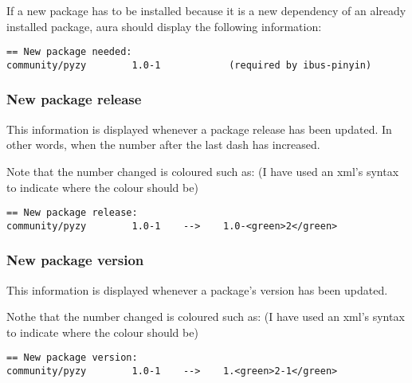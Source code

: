\documentclass{article}
\begin{document}
If a new package has to be installed because it is a new dependency of an
already installed package, aura should display the following information:

\begin{shaded}
\begin{verbatim}
== New package needed:
community/pyzy        1.0-1            (required by ibus-pinyin)
\end{verbatim}
\end{shaded}


\subsubsection{New package release}

This information is displayed whenever a package release has been updated. In
other words, when the number after the last dash has increased.

Note that the number changed is coloured such as: (I have used an xml's syntax
to indicate where the colour should be)

\begin{shaded}
\begin{verbatim}
== New package release:
community/pyzy        1.0-1    -->    1.0-<green>2</green>
\end{verbatim}
\end{shaded}


\subsubsection{New package version}

This information is displayed whenever a package's version has been updated.

Nothe that the number changed is coloured such as: (I have used an xml's syntax
to indicate where the colour should be)

\begin{shaded}
\begin{verbatim}
== New package version:
community/pyzy        1.0-1    -->    1.<green>2-1</green>
\end{verbatim}
\end{shaded}

\end{document}
